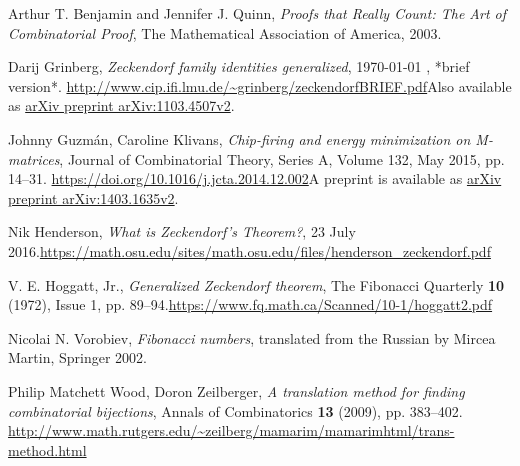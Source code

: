 \documentclass[numbers=enddot,12pt,final,onecolumn,notitlepage]{scrartcl}%
\numberwithin{exer}{section}
\theoremstyle{definition}
\begin{document}
\begin{thebibliography}{99999999}                                                                                         %


Arthur T. Benjamin and Jennifer J. Quinn,
\textit{Proofs that Really Count: The Art of Combinatorial Proof}, The
Mathematical Association of America, 2003.

Darij Grinberg, \textit{Zeckendorf family
identities generalized},
\today
, *brief version*.\newline%
\url{http://www.cip.ifi.lmu.de/~grinberg/zeckendorfBRIEF.pdf}\newline Also
available as \href{https://arxiv.org/abs/1103.4507v2}{arXiv preprint
arXiv:1103.4507v2}.

Johnny Guzm\'{a}n, Caroline Klivans,
\textit{Chip-firing and energy minimization on M-matrices}, Journal of
Combinatorial Theory, Series A, Volume 132, May 2015, pp. 14--31.\newline%
\url{https://doi.org/10.1016/j.jcta.2014.12.002}\newline A preprint is
available as \href{https://arxiv.org/abs/1403.1635v2}{arXiv preprint
arXiv:1403.1635v2}.

Nik Henderson, \textit{What is Zeckendorf's
Theorem?}, 23 July 2016.\newline\url{https://math.osu.edu/sites/math.osu.edu/files/henderson_zeckendorf.pdf}

V. E. Hoggatt, Jr., \textit{Generalized Zeckendorf
theorem}, The Fibonacci Quarterly \textbf{10} (1972), Issue 1, pp.
89--94.\newline\url{https://www.fq.math.ca/Scanned/10-1/hoggatt2.pdf}

Nicolai N. Vorobiev, \textit{Fibonacci numbers},
translated from the Russian by Mircea Martin, Springer 2002.

Philip Matchett Wood, Doron Zeilberger, \textit{A
translation method for finding combinatorial bijections}, Annals of
Combinatorics \textbf{13} (2009), pp. 383--402. \newline\url{http://www.math.rutgers.edu/~zeilberg/mamarim/mamarimhtml/trans-method.html}
\end{thebibliography}
\end{document}
